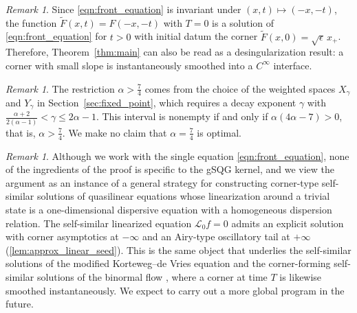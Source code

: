 \documentclass[11pt]{amsart}
\theoremstyle{definition}
\theoremstyle{remark}
\newtheorem{remark}[theorem]{Remark}
\numberwithin{equation}{section}
\newcommand{\sq}[1]{\widetilde{#1}}
\newcommand{\mc}[1]{\mathcal{#1}}
\newcommand{\ang}[1]{\langle #1 \rangle}
\begin{document}
\begin{remark}
Since \eqref{eqn:front_equation} is invariant under $(x,t) \mapsto (-x,-t)$, the function $\sq{F}(x,t) = F(-x,-t)$ with $T = 0$ is a solution of \eqref{eqn:front_equation} for $t > 0$ with initial datum the corner $\sq{F}(x,0) = \sqrt{\epsilon}\, x_+$. Therefore, Theorem~\ref{thm:main} can also be read as a desingularization result: a corner with small slope is instantaneously smoothed into a $C^\infty$ interface.
\end{remark}


\begin{remark}
The restriction $\alpha > \frac{7}{4}$ comes from the choice of the weighted spaces $X_\gamma$ and $Y_\gamma$ in Section~\ref{sec:fixed_point}, which requires a decay exponent $\gamma$ with $\frac{\alpha+2}{2(\alpha-1)} < \gamma \leq 2\alpha - 1$. This interval is nonempty if and only if $\alpha(4\alpha - 7) > 0$, that is, $\alpha > \frac{7}{4}$. We make no claim that $\alpha = \frac{7}{4}$ is optimal.
\end{remark}

\begin{remark}
Although we work with the single equation \eqref{eqn:front_equation}, none of the ingredients of the proof is specific to the gSQG kernel, and we view the argument as an instance of a general strategy for constructing corner-type self-similar solutions of quasilinear equations whose linearization around a trivial state is a one-dimensional dispersive equation with a homogeneous dispersion relation. The self-similar linearized equation $\mc{L}_0 f = 0$ admits an explicit solution with corner asymptotics at $-\infty$ and an Airy-type oscillatory tail at $+\infty$ (\cref{lem:approx_linear_seed}). This is the same object that underlies the self-similar solutions of the modified Korteweg--de Vries equation \cite{Perelman-Vega:self-similar-mkdv,Correia-Cote-Vega:asymptotics-mkdv} and the corner-forming self-similar solutions of the binormal flow \cite{Gutierrez-Rivas-Vega:self-similar-binormal,Banica-Vega:stability-selfsimilar-binormal}, where a corner at time $T$ is likewise smoothed instantaneously. We expect to carry out a more global program in the future.
\end{remark}
\end{document}
